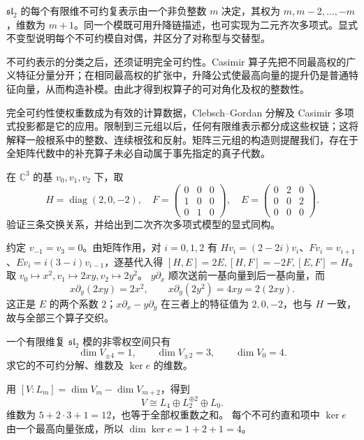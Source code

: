 \begin{chaptersummary}
	\(\mathfrak{sl}_2\) 的每个有限维不可约复表示由一个非负整数 \(m\) 决定，其权为 \(m,m-2,\ldots,-m\)，维数为 \(m+1\)。同一个模既可用升降链描述，也可实现为二元齐次多项式。显式不变型说明每个不可约模自对偶，并区分了对称型与交替型。

	\ProseParagraphBreak

	不可约表示的分类之后，还须证明完全可约性。Casimir 算子先把不同最高权的广义特征分量分开；在相同最高权的扩张中，升降公式使最高向量的提升仍是普通特征向量，从而构造补模。由此才得到权算子的可对角化及权的整数性。

	\ProseParagraphBreak

	完全可约性使权重数成为有效的计算数据，Clebsch--Gordan 分解及 Casimir 多项式投影都是它的应用。限制到三元组以后，任何有限维表示都分成这些权链；这将解释一般根系中的整数、连续根弦和反射。矩阵三元组的构造则提醒我们，存在于全矩阵代数中的补充算子未必自动属于事先指定的真子代数。
\end{chaptersummary}

\BookExercises

\begin{exercise}\label{b5:ex:14-three-matrices}
	在 \(\mathbb C^3\) 的基 \(v_0,v_1,v_2\) 下，取
	\[
		H=\operatorname{diag}(2,0,-2),\quad
		F=\begin{pmatrix}0&0&0\\1&0&0\\0&1&0\end{pmatrix},\quad
		E=\begin{pmatrix}0&2&0\\0&0&2\\0&0&0\end{pmatrix}.
	\]
	验证三条交换关系，并给出到二次齐次多项式模型的显式同构。
\end{exercise}
\begin{solution}
	约定 \(v_{-1}=v_3=0\)。由矩阵作用，对 \(i=0,1,2\) 有 \(Hv_i=(2-2i)v_i\)、\(Fv_i=v_{i+1}\)、\(Ev_i=i(3-i)v_{i-1}\)，逐基代入得 \([H,E]=2E,[H,F]=-2F,[E,F]=H\)。 取 \(v_0\mapsto x^2,v_1\mapsto2xy,v_2\mapsto2y^2\)。 \(y\partial_x\) 顺次送前一基向量到后一基向量，而
	\[
		x\partial_y(2xy)=2x^2,\qquad x\partial_y(2y^2)=4xy=2(2xy).
	\]
	这正是 \(E\) 的两个系数 \(2\)；\(x\partial_x-y\partial_y\) 在三者上的特征值为 \(2,0,-2\)，也与 \(H\) 一致，故与全部三个算子交织。
\end{solution}

\begin{exercise}\label{b5:ex:14-weight-multiplicities}
	一个有限维复 \(\mathfrak{sl}_2\) 模的非零权空间只有
	\[
		\dim V_{\pm4}=1,\qquad \dim V_{\pm2}=3,\qquad \dim V_0=4.
	\]
	求它的不可约分解、维数及 \(\ker e\) 的维数。
\end{exercise}
\begin{solution}
	用 \([V:L_m]=\dim V_m-\dim V_{m+2}\)，得到
	\[
		V\cong L_4\oplus L_2^{\oplus2}\oplus L_0.
	\]
	维数为 \(5+2\cdot3+1=12\)，也等于全部权重数之和。 每个不可约直和项中 \(\ker e\) 由一个最高向量张成，所以 \(\dim\ker e=1+2+1=4\)。
\end{solution}

